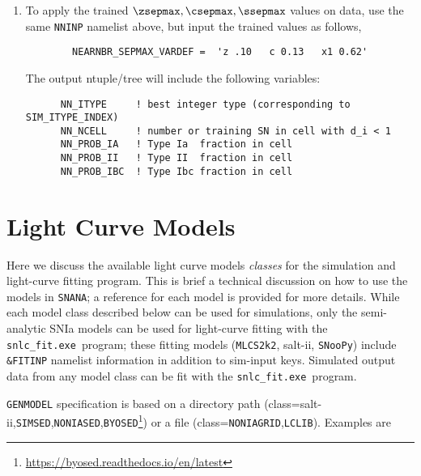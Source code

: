 \documentclass[12pt]{article}
\newcommand{\snfitter}{{\tt snlc\_fit.exe}}
\newcommand{\mlcs}{{\tt MLCS2k2}}
\newcommand{\SALTII}{{\sc salt-ii}}
\newcommand{\snoopy}{{\tt SNooPy}}
\newcommand{\SIMSED}{{\tt SIMSED}}
\newcommand{\BYOSED}{{\tt BYOSED}}
\newcommand{\NONIA}{{\tt NONIASED}}
\newcommand{\NONIAGRID}{{\tt NONIAGRID}}
\newcommand{\LCLIB}{{\tt LCLIB}}
\newcommand{\snana}{{\tt SNANA}}
\begin{document}
\begin{enumerate}
%
 \item To apply the trained $\zsepmax,\csepmax,\ssepmax$ values
       on data, use the same {\tt NNINP} namelist above, 
       but input the trained values as follows,
     \begin{verbatim}
        NEARNBR_SEPMAX_VARDEF =  'z .10   c 0.13   x1 0.62'
     \end{verbatim}
       The output ntuple/tree will include the following variables:
     \begin{verbatim}
      NN_ITYPE     ! best integer type (corresponding to SIM_ITYPE_INDEX)
      NN_NCELL     ! number or training SN in cell with d_i < 1
      NN_PROB_IA   ! Type Ia  fraction in cell
      NN_PROB_II   ! Type II  fraction in cell
      NN_PROB_IBC  ! Type Ibc fraction in cell
     \end{verbatim}
\end{enumerate}


   \clearpage
   \section{Light Curve Models}
   \label{sec:models}


Here we discuss the available light curve models {\it classes}
for the simulation and light-curve fitting program. 
This is brief a technical discussion on how to use the models in \snana; 
a reference for each model is provided for more details.
While each model class described below can be used for
simulations, only the semi-analytic SNIa models can be
used for light-curve fitting with the \snfitter\ program;
these fitting models (\mlcs, \SALTII, \snoopy) include 
{\tt\&FITINP} namelist information in addition to sim-input keys.
Simulated output data from any model class can be fit with 
the \snfitter\ program.


{\tt GENMODEL} specification is based on a directory path 
(class=\SALTII,\SIMSED,\NONIA,\BYOSED\footnote{\url{https://byosed.readthedocs.io/en/latest}}) 
or a file (class=\NONIAGRID,\LCLIB).
Examples are
\end{document}
